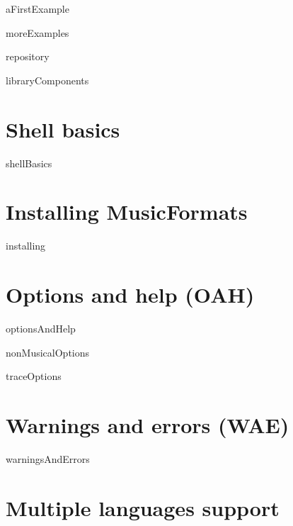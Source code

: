 \documentclass[11pt,a4paper]{report}
\begin{document}
{aFirstExample}

{moreExamples}

{repository}

{libraryComponents}


\part{Shell basics}

{shellBasics}


\part{Installing MusicFormats}

{installing}


\part{Options and help (OAH)}

{optionsAndHelp}

{nonMusicalOptions}

{traceOptions}



\part{Warnings and errors (WAE)}

{warningsAndErrors}


\part{Multiple languages support}
\end{document}
